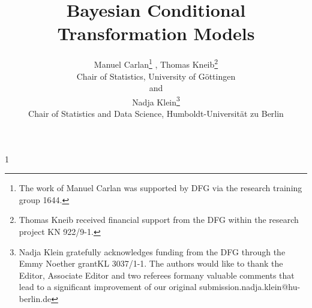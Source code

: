 \documentclass[12pt]{article}
\theoremstyle{plain}
\newcommand{\blind}{1}
\begin{document}
\def\spacingset#1{\renewcommand{\baselinestretch}%
{#1}\small\normalsize} \spacingset{1}

\blind
{
  \title{\bf Bayesian Conditional Transformation Models}
  \author{Manuel Carlan\thanks{
    The work of Manuel Carlan was supported by DFG via the research training group 1644.} ,\hspace{.2cm} Thomas Kneib\thanks{
    Thomas Kneib received financial support from the DFG within the research project KN 922/9-1.}\\
    Chair of Statistics, University of G\"{o}ttingen\\
    and\\
    Nadja Klein\thanks{\protect\linespread{1}\protect\selectfont
    Nadja Klein gratefully acknowledges funding from the DFG through the Emmy Noether grant\newline\hspace*{1.7em}KL 3037/1-1. The authors would like to thank the Editor, Associate Editor and two referees for\newline\hspace*{1.7em}many valuable comments that lead
to a significant improvement of our original submission.\newline\hspace*{1.7em}nadja.klein@hu-berlin.de}\\
    Chair of Statistics and Data Science, Humboldt-Universit\"{a}t zu Berlin
    }
      \date{}
  \maketitle
  \thispagestyle{empty}
} \fi
\end{document}
